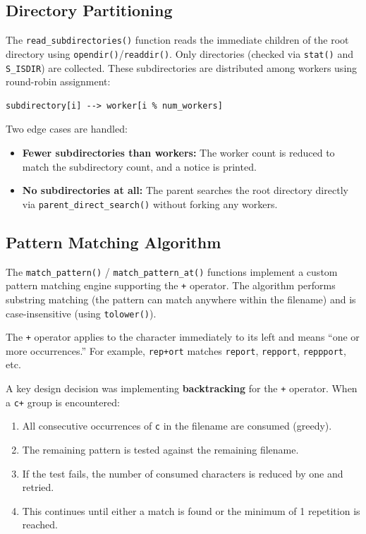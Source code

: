 \documentclass[12pt,a4paper]{article}
\begin{document}
\subsection{Directory Partitioning}

The \texttt{read\_subdirectories()} function reads the immediate children of the root directory using \texttt{opendir()}/\texttt{readdir()}. Only directories (checked via \texttt{stat()} and \texttt{S\_ISDIR}) are collected. These subdirectories are distributed among workers using round-robin assignment:

\begin{lstlisting}
subdirectory[i] --> worker[i % num_workers]
\end{lstlisting}

Two edge cases are handled:

\begin{itemize}[noitemsep]
    \item \textbf{Fewer subdirectories than workers:} The worker count is reduced to match the subdirectory count, and a notice is printed.
    \item \textbf{No subdirectories at all:} The parent searches the root directory directly via \texttt{parent\_direct\_search()} without forking any workers.
\end{itemize}

\subsection{Pattern Matching Algorithm}

The \texttt{match\_pattern()} / \texttt{match\_pattern\_at()} functions implement a custom pattern matching engine supporting the \texttt{+} operator. The algorithm performs substring matching (the pattern can match anywhere within the filename) and is case-insensitive (using \texttt{tolower()}).

The \texttt{+} operator applies to the character immediately to its left and means ``one or more occurrences.'' For example, \texttt{rep+ort} matches \texttt{report}, \texttt{repport}, \texttt{reppport}, etc.

A key design decision was implementing \textbf{backtracking} for the \texttt{+} operator. When a \texttt{c+} group is encountered:

\begin{enumerate}[noitemsep]
    \item All consecutive occurrences of \texttt{c} in the filename are consumed (greedy).
    \item The remaining pattern is tested against the remaining filename.
    \item If the test fails, the number of consumed characters is reduced by one and retried.
    \item This continues until either a match is found or the minimum of 1 repetition is reached.
\end{enumerate}
\end{document}

